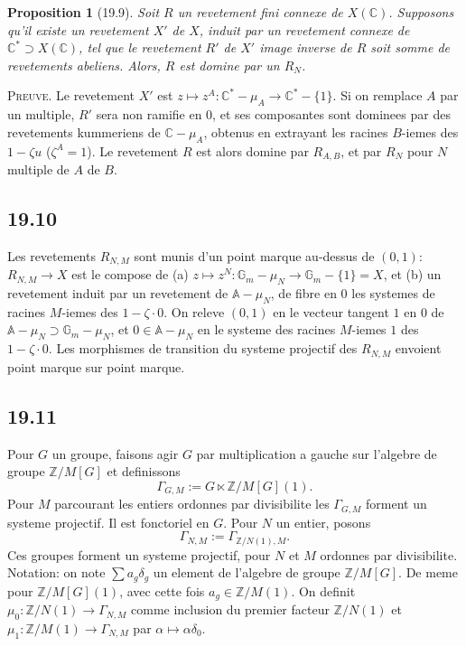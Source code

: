 \documentclass[12pt,a4paper]{article}
\theoremstyle{plain}
\newtheorem{proposition}[theorem]{Proposition}
\theoremstyle{definition}
\theoremstyle{remark}
\newcommand{\Gm}{\mathbb{G}_m}
\newcommand{\ZZ}{\mathbb{Z}}
\newcommand{\CC}{\mathbb{C}}
\newcommand{\GA}{\mathbb{A}}
\begin{document}
\begin{proposition}[19.9]\label{prop:19.9}
Soit $R$ un revetement fini connexe de $X(\CC)$. Supposons qu'il
existe un revetement $X'$ de $X$, induit par un revetement connexe de
$\CC^* \supset X(\CC)$, tel que le revetement $R'$ de $X'$ image
inverse de $R$ soit somme de revetements abeliens. Alors, $R$ est
domine par un $R_N$.
\end{proposition}

\noindent \textsc{Preuve.} Le revetement $X'$ est $z \mapsto z^A :
\CC^* - \mu_A \to \CC^* - \{1\}$. Si on remplace $A$ par un
multiple, $R'$ sera non ramifie en $0$, et ses composantes sont
dominees par des revetements kummeriens de $\CC - \mu_A$, obtenus en
extrayant les racines $B$-iemes des $1 - \zeta u$ ($\zeta^A = 1$).
Le revetement $R$ est alors domine par $R_{A,B}$, et par $R_N$ pour
$N$ multiple de $A$ de $B$.

\subsection{19.10}

Les revetements $R_{N,M}$ sont munis d'un point marque au-dessus de
$(0,1)$: $R_{N,M} \to X$ est le compose de (a) $z \mapsto z^N : \Gm -
\mu_N \to \Gm - \{1\} = X$, et (b) un revetement induit par un
revetement de $\GA - \mu_N$, de fibre en $0$ les systemes de racines
$M$-iemes des $1 - \zeta \cdot 0$. On releve $(0,1)$ en le vecteur
tangent $1$ en $0$ de $\GA - \mu_N \supset \Gm - \mu_N$, et
$0 \in \GA - \mu_N$ en le systeme des racines $M$-iemes $1$ des
$1 - \zeta \cdot 0$. Les morphismes de transition du systeme projectif
des $R_{N,M}$ envoient point marque sur point marque.

\subsection{19.11}

Pour $G$ un groupe, faisons agir $G$ par multiplication a gauche sur
l'algebre de groupe $\ZZ/M[G]$ et definissons
\[
\Gamma_{G,M} := G \ltimes \ZZ/M[G](1).
\]
Pour $M$ parcourant les entiers ordonnes par divisibilite les
$\Gamma_{G,M}$ forment un systeme projectif. Il est fonctoriel en
$G$. Pour $N$ un entier, posons
\[
\Gamma_{N,M} := \Gamma_{\ZZ/N(1),M}.
\]
Ces groupes forment un systeme projectif, pour $N$ et $M$ ordonnes
par divisibilite. Notation: on note $\sum a_g \delta_g$ un element de
l'algebre de groupe $\ZZ/M[G]$. De meme pour $\ZZ/M[G](1)$, avec
cette fois $a_g \in \ZZ/M(1)$. On definit $\mu_0 : \ZZ/N(1) \to
\Gamma_{N,M}$ comme inclusion du premier facteur $\ZZ/N(1)$ et
$\mu_1 : \ZZ/M(1) \to \Gamma_{N,M}$ par $\alpha \mapsto \alpha \delta_0$.
\end{document}

